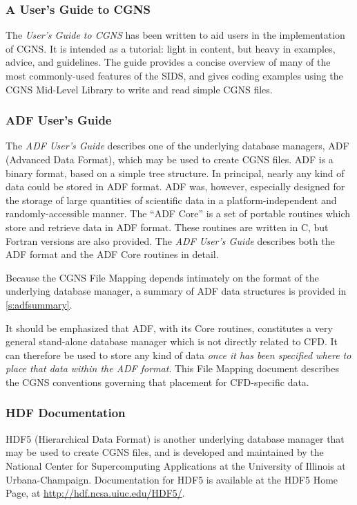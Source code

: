 \subsubsection{A User's Guide to CGNS}

The \textit{User's Guide to CGNS} has been written to aid users in the
implementation of CGNS.
It is intended as a tutorial: light in content, but heavy in examples,
advice, and guidelines.
The guide provides a concise overview of many of the most commonly-used
features of the SIDS, and gives coding examples using the CGNS Mid-Level
Library to write and read simple CGNS files.

\subsubsection{ADF User's Guide}

The \textit{ADF User's Guide} describes one of the underlying database
managers, ADF (Advanced Data Format), which may be used to create CGNS
files.
ADF is a binary format, based on a simple tree structure.
In principal, nearly any kind of data could be stored in ADF format.
ADF was, however, especially designed for the storage of large
quantities of scientific data in a platform-independent and
randomly-accessible manner.
The ``ADF Core'' is a set of portable routines which store and retrieve
data in ADF format.
These routines are written in C, but Fortran versions are also provided.
The \textit{ADF User's Guide} describes both the ADF format and the ADF
Core routines in detail.

Because the CGNS File Mapping depends intimately on the format of
the underlying database manager, a summary of ADF data structures is
provided in \autoref{s:adfsummary}.

It should be emphasized that ADF, with its Core routines, constitutes a
very general stand-alone database manager which is not directly related
to CFD. It can therefore be used to store any kind of data \emph{once it has
been specified where to place that data within the ADF format}.
This File Mapping document describes the CGNS conventions governing that
placement for CFD-specific data.

\subsubsection{HDF Documentation}

HDF5 (Hierarchical Data Format) is another underlying database manager
that may be used to create CGNS files, and is developed and maintained
by the National Center for Supercomputing Applications at the University
of Illinois at Urbana-Champaign.
Documentation for HDF5 is available at the HDF5 Home Page, at
\url{http://hdf.ncsa.uiuc.edu/HDF5/}.

